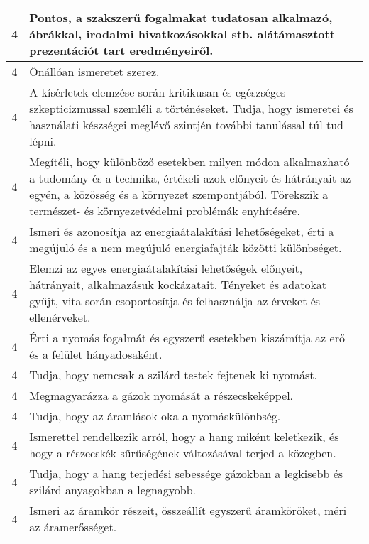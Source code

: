 \begin{longtable}{c | p{} }
                                
                                          4 &  Pontos, a szakszerű fogalmakat tudatosan alkalmazó, ábrákkal, irodalmi hivatkozásokkal stb. alátámasztott prezentációt tart eredményeiről. \\ \hline
                                          4 &  Önállóan ismeretet szerez. \\ \hline
                                          4 &  A kísérletek elemzése során kritikusan és egészséges szkepticizmussal szemléli a történéseket. Tudja, hogy ismeretei és használati készségei meglévő szintjén további tanulással túl tud lépni. \\ \hline
                                          4 &  Megítéli, hogy különböző esetekben milyen módon alkalmazható a tudomány és a technika, értékeli azok előnyeit és hátrányait az egyén, a közösség és a környezet szempontjából. Törekszik a természet- és környezetvédelmi problémák enyhítésére. \\ \hline
                                          4 &  Ismeri és azonosítja az energiaátalakítási lehetőségeket, érti a megújuló és a nem megújuló energiafajták közötti különbséget. \\ \hline
                                          4 &  Elemzi az egyes energiaátalakítási lehetőségek előnyeit, hátrányait, alkalmazásuk kockázatait. Tényeket és adatokat gyűjt, vita során csoportosítja és felhasználja az érveket és ellenérveket. \\ \hline
                                          4 &  Érti a nyomás fogalmát és egyszerű esetekben kiszámítja az erő és a felület hányadosaként. \\ \hline
                                          4 &  Tudja, hogy nemcsak a szilárd testek fejtenek ki nyomást. \\ \hline
                                          4 &  Megmagyarázza a gázok nyomását a részecskeképpel. \\ \hline
                                          4 &  Tudja, hogy az áramlások oka a nyomáskülönbség. \\ \hline
                                          4 &  Ismerettel rendelkezik arról, hogy a hang miként keletkezik, és hogy a részecskék sűrűségének változásával terjed a közegben. \\ \hline
                                          4 &  Tudja, hogy a hang terjedési sebessége gázokban a legkisebb és szilárd anyagokban a legnagyobb. \\ \hline
                                          4 &  Ismeri az áramkör részeit, összeállít egyszerű áramköröket, méri az áramerősséget. \\ \hline

\end{longtable}

